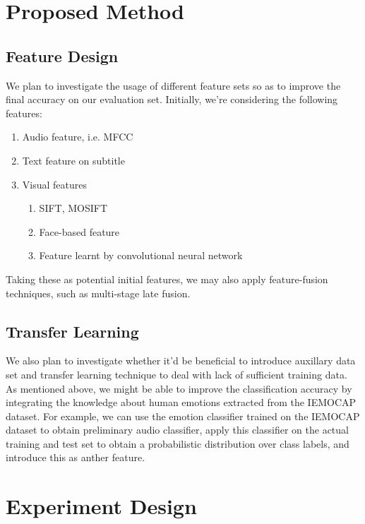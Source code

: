 \documentclass[a4page]{article}
\begin{document}
\section{Proposed Method}

\subsection{Feature Design}
We plan to investigate the usage of different feature sets so as to improve the final accuracy on our evaluation set. Initially, we're considering the following features:

\begin{enumerate}
\item Audio feature, i.e. MFCC
\item Text feature on subtitle
\item Visual features
    \begin{enumerate}
    \item SIFT, MOSIFT
    \item Face-based feature
    \item Feature learnt by convolutional neural network
    \end{enumerate}
\end{enumerate}

Taking these as potential initial features, we may also apply feature-fusion techniques, such as multi-stage late fusion. 

\subsection{Transfer Learning}

We also plan to investigate whether it'd be beneficial to introduce auxillary data set and transfer learning technique to deal with lack of sufficient training data. As mentioned above, we might be able to improve the classification accuracy by integrating the knowledge about human emotions extracted from the IEMOCAP dataset. For example, we can use the emotion classifier trained on the IEMOCAP dataset to obtain preliminary audio classifier, apply this classifier on the actual training and test set to obtain a probabilistic distribution over class labels, and introduce this as anther feature.  

\section{Experiment Design}
\end{document}
